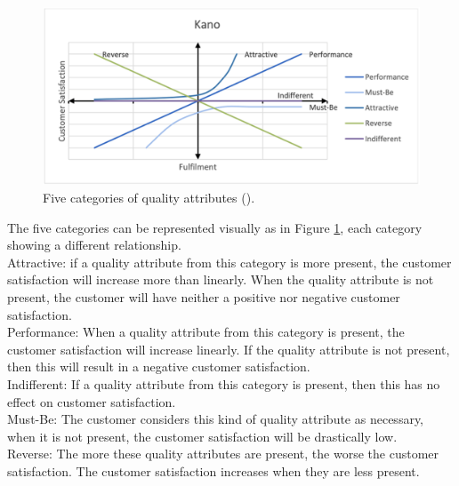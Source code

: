 \begin{figure}[ht]
	\includegraphics[scale=0.35]{../LaTeX/Figures/KANO.png}
	\caption{Five categories of quality attributes (\cite{KANO1984}).}
	\label{fig:kano}
\end{figure}
\break
The five categories can be represented visually as in Figure \ref{fig:kano}, each category showing a different relationship.\\
\break
Attractive: if a quality attribute from this category is more present, the customer satisfaction will increase more than linearly. When the quality attribute is not present, the customer will have neither a positive nor negative customer satisfaction.\\
\break
Performance: When a quality attribute from this category is present, the customer satisfaction will increase linearly. If the quality attribute is not present, then this will result in a negative customer satisfaction.\\
\break
Indifferent: If a quality attribute from this category is present, then this has no effect on customer satisfaction.\\
\break
Must-Be: The customer considers this kind of quality attribute as necessary, when it is not present, the customer satisfaction will be drastically low.\\
\break
Reverse: The more these quality attributes are present, the worse the customer satisfaction. The customer satisfaction increases when they are less present.\\

